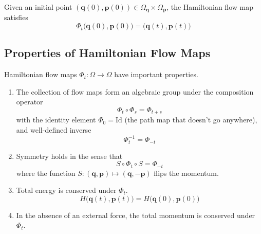 \documentclass{article}
\theoremstyle{remark}
\theoremstyle{definition}
\begin{document}
Given an initial point $(\mathbf{q}(0), \mathbf{p}(0)) \in \Omega_{\mathbf{q}} \times \Omega_{\mathbf{p}}$, the Hamiltonian flow map satisfies 
\[\Phi_t \big( \mathbf{q}(0), \mathbf{p}(0) \big) = \big(\mathbf{q}(t), \mathbf{p}(t)\big)\]

\subsection{Properties of Hamiltonian Flow Maps}
Hamiltonian flow maps $\Phi_t : \Omega \longrightarrow \Omega$ have important properties. 
\begin{enumerate}
    \item The collection of flow maps form an algebraic group under the composition operator
    \[\Phi_t \circ \Phi_s = \Phi_{t + s}\]
    with the identity element $\Phi_0 = \mathrm{Id}$ (the path map that doesn't go anywhere), and well-defined inverse 
    \[\Phi_t^{-1} = \Phi_{-t}\]
    \item Symmetry holds in the sense that 
    \[S \circ \Phi_t \circ S = \Phi_{-t}\]
    where the function $S: (\mathbf{q}, \mathbf{p}) \mapsto (\mathbf{q}, -\mathbf{p})$ flips the momentum. 
    \item Total energy is conserved under $\Phi_t$. 
    \[H\big( \mathbf{q}(t), \mathbf{p}(t) \big) = H\big( \mathbf{q}(0), \mathbf{p}(0) \big)\]
    \item In the absence of an external force, the total momentum is conserved under $\Phi_t$. 
\end{enumerate}
\end{document}

